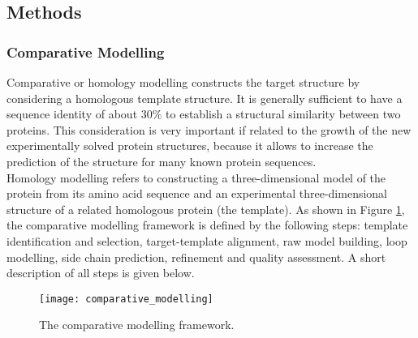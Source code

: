 \subsection{Methods}
\label{subsec:methods}
\subsubsection{Comparative Modelling}
\label{subsubsec:comparative_modelling}
Comparative or homology modelling constructs the target structure by considering a homologous template structure. It is generally sufficient to have a sequence identity of about $30\%$ to establish a structural similarity between two proteins. This consideration is very important if related to the growth of the new experimentally solved protein structures, because it allows to increase the prediction of the structure for many known protein sequences.\\
Homology modelling refers to constructing a three-\-di\-men\-sio\-nal model of the  protein from its amino acid sequence and an experimental three-\-di\-men\-sio\-nal structure of a related homologous protein (the template). As shown in Figure \ref{fig:comparative_modelling}, the comparative modelling framework is defined by the following steps: template identification and selection, target-template alignment, raw model building, loop modelling, side chain prediction, refinement and quality assessment. A short description of all steps is given below.\\
\begin{figure}[tb]
	\begin{center}
		\texttt{[image: comparative\_modelling]}
		\caption[The comparative modelling framework]{The comparative modelling framework.}
		\label{fig:comparative_modelling}
	\end{center}
\end{figure}
